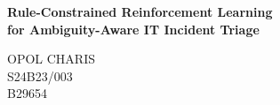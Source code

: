 \documentclass[12pt,a4paper]{article}
\begin{document}
\begin{center}
  {\LARGE\bfseries Rule-Constrained Reinforcement Learning\\for Ambiguity-Aware IT Incident Triage\par}
  \vspace{1.5em}
  {\large OPOL CHARIS\\
  S24B23/003\\
  B29654\par}
\end{center}
\vspace{1.5em}





\clearpage


\end{document}
